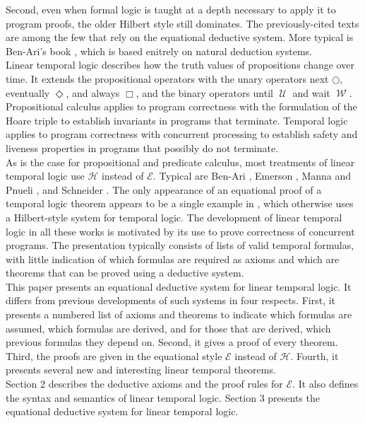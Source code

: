 \documentclass[fleqn, leqno]{article}
\newcommand{\Until}{\;\mathcal{U}\;}
\newcommand{\Wait}{\;\mathcal{W}\;}
\newcommand{\Next}{\bigcirc}
\newcommand{\Event}{\Diamond}
\newcommand{\Always}{\Box}
\begin{document}
Second, even when formal logic is taught at a depth necessary to apply it to program proofs, the older Hilbert style
still dominates.
The previously-cited texts \cite{Cohen, LADM, Kald} are among the few that rely on the equational deductive system. 
More typical is Ben-Ari's book \cite{Ben}, which is based enitrely on natural deduction systems.\\

Linear temporal logic describes how the truth values of propositions change over time.
It extends the propositional operators with the unary operators next $\Next$, eventually $\Event$, and always $\Always$,
and the binary operators until $\Until$ and wait $\Wait$.
Propositional calculus applies to program correctness with the formulation of the Hoare triple to establish invariants
in programs that terminate.
Temporal logic applies to program correctness with concurrent processing to establish safety and liveness properties
in programs that possibly do not terminate.\\

As is the case for propositional and predicate calculus, most treatments of linear temporal logic use $\mathcal{H}$
instead of $\mathcal{E}$. Typical are Ben-Ari \cite{Ben2}, Emerson \cite{Emer}, Manna and Pnueli \cite{Manna}, and 
Schneider \cite{Schn}.
The only appearance of an equational proof of a temporal logic theorem appears to be a single example in \cite{Schn},
which otherwise uses a Hilbert-style system for temporal logic.
The development of linear temporal logic in all these works is motivated by its use to prove correctness of concurrent programs.
The presentation typically consists of lists of valid temporal formulas, with little indication of which formulas are required
as axioms and which are theorems that can be proved using a deductive system.\\

This paper presents an equational deductive system for linear temporal logic.
It differs from previous developments of such systems in four respects.
First, it presents a numbered list of axioms and theorems to indicate which formulas are assumed, which formulas are
derived, and for those that are derived, which previous formulas they depend on.
Second, it gives a proof of every theorem.
Third, the proofs are given in the equational style $\mathcal{E}$ instead of $\mathcal{H}$.
Fourth, it presents several new and interesting linear temporal theorems.\\

Section 2 describes the deductive axioms and the proof rules for $\mathcal{E}$.
It also defines the syntax and semantics of linear temporal logic.
Section 3 presents the equational deductive system for linear temporal logic.\\
\end{document}
